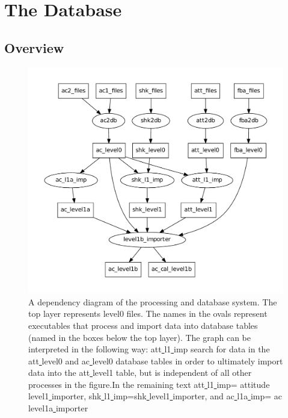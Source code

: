 \documentclass[12pt]{article}
\begin{document}
\clearpage
\newpage




\section{The Database}
\subsection{Overview}
\begin{figure}[!t]
\centering
\includegraphics[scale=0.7]{dataflow.pdf}
\caption{A dependency diagram of the processing and database system. 
The top layer represents level0 files.
The names in the ovals represent executables that process and import
data into database tables (named in the boxes below the top layer).
The graph can be interpreted in the following way: 
att\underline{ }l1\underline{ }imp search for data
in the att\underline{ }level0 and ac\underline{ }level0 
database tables in order to ultimately import data into the
att\underline{ }level1 table, but is independent of all
other processes in the figure.In the remaining text
att\underline{ }l1\underline{ }imp= attitude\underline{ }level1\underline{ }importer, shk\underline{ }l1\underline{ }imp=shk\underline{ }level1\underline{ }importer, and ac\underline{ }l1a\underline{ }imp= ac\underline{ }level1a\underline{ }importer
}
\label{fig:database}
\end{figure}
\end{document}
